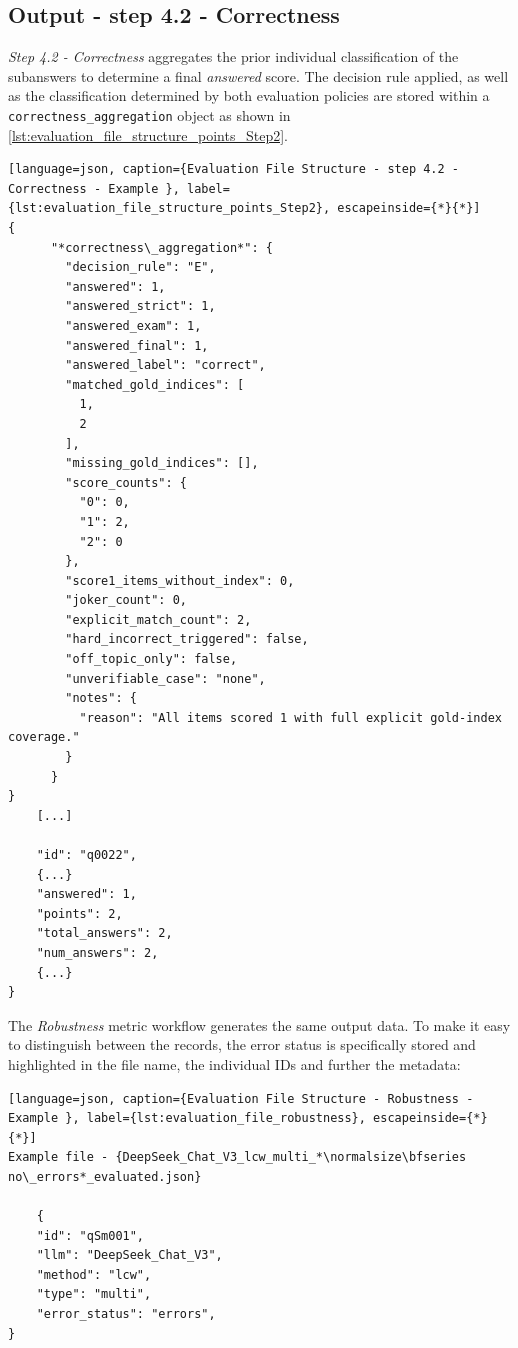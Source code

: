 \subsection{Output - step 4.2 - Correctness}\label{subsub:output_4_2_correct}
\textit{Step 4.2 - Correctness} aggregates the prior individual classification of the subanswers to determine a final \textit{answered} score.
The decision rule applied, as well as the classification determined by both evaluation policies are stored within a \texttt{correctness\_aggregation} object as shown in \cref{lst:evaluation_file_structure_points_Step2}.

\begin{lstlisting}[language=json, caption={Evaluation File Structure - step 4.2 - Correctness - Example }, label={lst:evaluation_file_structure_points_Step2}, escapeinside={*}{*}]
{
      "*correctness\_aggregation*": {
        "decision_rule": "E",
        "answered": 1,
        "answered_strict": 1,
        "answered_exam": 1,
        "answered_final": 1,
        "answered_label": "correct",
        "matched_gold_indices": [
          1,
          2
        ],
        "missing_gold_indices": [],
        "score_counts": {
          "0": 0,
          "1": 2,
          "2": 0
        },
        "score1_items_without_index": 0,
        "joker_count": 0,
        "explicit_match_count": 2,
        "hard_incorrect_triggered": false,
        "off_topic_only": false,
        "unverifiable_case": "none",
        "notes": {
          "reason": "All items scored 1 with full explicit gold-index coverage."
        }
      }
}
    [...]

    "id": "q0022",
    {...}
    "answered": 1,
    "points": 2,
    "total_answers": 2,
    "num_answers": 2,
    {...}
}
\end{lstlisting}

The \textit{Robustness} metric workflow generates the same output data.
To make it easy to distinguish between the records, the error status is specifically stored and highlighted in the file name, the individual IDs and further the metadata:

\begin{lstlisting}[language=json, caption={Evaluation File Structure - Robustness - Example }, label={lst:evaluation_file_robustness}, escapeinside={*}{*}]
Example file - {DeepSeek_Chat_V3_lcw_multi_*\normalsize\bfseries no\_errors*_evaluated.json}

    {
    "id": "qSm001",
    "llm": "DeepSeek_Chat_V3",
    "method": "lcw",
    "type": "multi",
    "error_status": "errors",
}
\end{lstlisting}


 